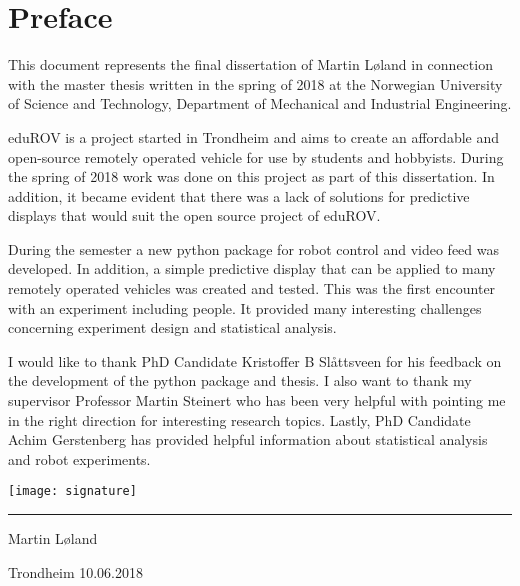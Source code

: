 \chapter*{Preface}

This document represents the final dissertation of Martin Løland in connection with the master thesis written in the spring of 2018 at the Norwegian University of Science and Technology, Department of Mechanical and Industrial Engineering.

eduROV is a project started in Trondheim and aims to create an affordable and open-source remotely operated vehicle for use by students and hobbyists. During the spring of 2018 work was done on this project as part of this dissertation. In addition, it became evident that there was a lack of solutions for predictive displays that would suit the open source project of eduROV.

During the semester a new python package for robot control and video feed was developed. In addition, a simple predictive display that can be applied to many remotely operated vehicles was created and tested. This was the first encounter with an experiment including people. It provided many interesting challenges concerning experiment design and statistical analysis.

I would like to thank PhD Candidate Kristoffer B Slåttsveen for his feedback on the development of the python package and thesis. I also want to thank my supervisor Professor Martin Steinert who has been very helpful with pointing me in the right direction for interesting research topics. Lastly, PhD Candidate Achim Gerstenberg has provided helpful information about statistical analysis and robot experiments. 

\vspace{1.5cm}
\parbox{\textwidth}{
\texttt{[image: signature]}
\vspace{-0.5cm}
\centering

\rule{6cm}{0.5pt}

Martin Løland

Trondheim 10.06.2018
}
